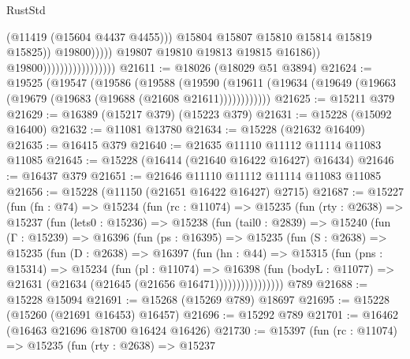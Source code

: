 \begin{lexlean}{RustStd}
\begin{coremodule}
                                                          (@11419 (@15604 @4437 @4455)))
                                                        @15804
                                                        @15807
                                                        @15810
                                                        @15814
                                                        @15819
                                                        @15825))
                                                    @19800)))))
                                          @19807
                                          @19810
                                          @19813
                                          @19815
                                          @16186))
                                      @19800)))))))))))))))))
@21611 := @18026 (@18029 @51 @3894)
@21624 := @19525
    (@19547
      (@19586
        (@19588
          (@19590 (@19611 (@19634 (@19649 (@19663 (@19679 (@19683 (@19688 (@21608 @21611))))))))))))
@21625 := @15211 @379
@21629 := @16389 (@15217 @379) (@15223 @379)
@21631 := @15228 (@15092 @16400)
@21632 := @11081 @13780
@21634 := @15228 (@21632 @16409)
@21635 := @16415 @379
@21640 := @21635 @11110 @11112 @11114 @11083 @11085
@21645 := @15228 (@16414 (@21640 @16422 @16427) @16434)
@21646 := @16437 @379
@21651 := @21646 @11110 @11112 @11114 @11083 @11085
@21656 := @15228 (@11150 (@21651 @16422 @16427) @2715)
@21687 := @15227
    (fun (fn : @74) =>
    @15234
      (fun (rc : @11074) =>
      @15235
        (fun (rty : @2638) =>
        @15237
          (fun (lets0 : @15236) =>
          @15238
            (fun (tail0 : @2839) =>
            @15240
              (fun (Γ : @15239) =>
              @16396
                (fun (ps : @16395) =>
                @15235
                  (fun (S : @2638) =>
                  @15235
                    (fun (D : @2638) =>
                    @16397
                      (fun (hn : @44) =>
                      @15315
                        (fun (pns : @15314) =>
                        @15234
                          (fun (pl : @11074) =>
                          @16398
                            (fun (bodyL : @11077) =>
                            @21631 (@21634 (@21645 (@21656 @16471))))))))))))))))
    @789
@21688 := @15228 @15094
@21691 := @15268 (@15269 @789) @18697
@21695 := @15228 (@15260 (@21691 @16453) @16457)
@21696 := @15292 @789
@21701 := @16462 (@16463 @21696 @18700 @16424 @16426)
@21730 := @15397
    (fun (rc : @11074) =>
    @15235
      (fun (rty : @2638) =>
      @15237

\end{coremodule}
\end{lexlean}
